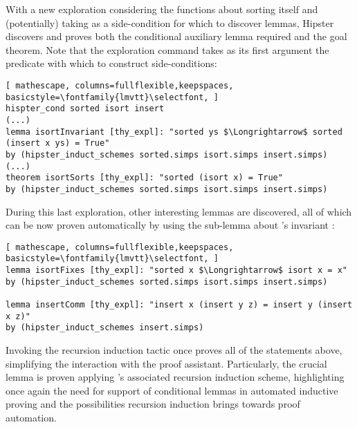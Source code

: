 With a new exploration considering the functions about sorting itself and (potentially) taking  as a side-condition for which to discover lemmas, Hipster discovers and proves both the conditional auxiliary lemma required and the goal theorem.
%
Note that the exploration command takes as its first argument the predicate with which to construct side-conditions:

\begin{lstlisting}[ mathescape, columns=fullflexible,keepspaces, basicstyle=\fontfamily{lmvtt}\selectfont, ]
hispter_cond sorted isort insert
(...)
lemma isortInvariant [thy_expl]: "sorted ys $\Longrightarrow$ sorted (insert x ys) = True"
by (hipster_induct_schemes sorted.simps isort.simps insert.simps)
(...)
theorem isortSorts [thy_expl]: "sorted (isort x) = True"
by (hipster_induct_schemes sorted.simps isort.simps insert.simps)
\end{lstlisting}

During this last exploration, other interesting lemmas are discovered, all of which can be now proven automatically by using the sub-lemma about 's invariant :

\begin{lstlisting}[ mathescape, columns=fullflexible,keepspaces, basicstyle=\fontfamily{lmvtt}\selectfont, ]
lemma isortFixes [thy_expl]: "sorted x $\Longrightarrow$ isort x = x"
by (hipster_induct_schemes sorted.simps isort.simps insert.simps)

lemma insertComm [thy_expl]: "insert x (insert y z) = insert y (insert x z)"
by (hipster_induct_schemes insert.simps)
\end{lstlisting}

Invoking the recursion induction tactic  once proves all of the statements above, simplifying the interaction with the proof assistant.
%
Particularly, the crucial lemma  is proven applying 's associated recursion induction scheme, highlighting once again the need for support of conditional lemmas in automated inductive proving and the possibilities recursion induction brings towards proof automation.


